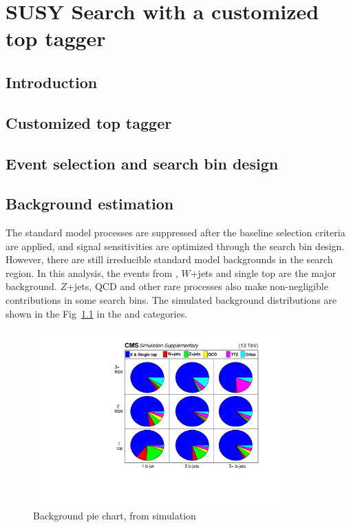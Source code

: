 \chapter{SUSY Search with a customized top tagger}

\clearpage
\section{Introduction}
\label{sec:c4intro}


\clearpage
\section{Customized top tagger}
\label{sec:c4tt}


\clearpage
\section{Event selection and search bin design}
\label{sec:c4evssbd}


\clearpage
\section{Background estimation}

The standard model processes are suppressed after the baseline selection criteria are applied, and signal sensitivities are optimized through the search bin design. However, there are still irreducible standard model backgrounds in the search region. In this analysis, the events from \ttbar, $W$+jets and single top are the major background. $Z$+jets, QCD and other rare processes also make non-negligible contributions in some search bins. The simulated background distributions are shown in the Fig~\ref{fig:c4bgmcpie} in the \ntops and \nbjets categories.

\begin{figure}[htbp]
 \begin{center}
  \includegraphics[width=0.85\textwidth]{figures/c4/c4_bg_mcpie.pdf}
 \end{center}
 \caption{Background pie chart, from simulation}
 \label{fig:c4bgmcpie}
\end{figure}

